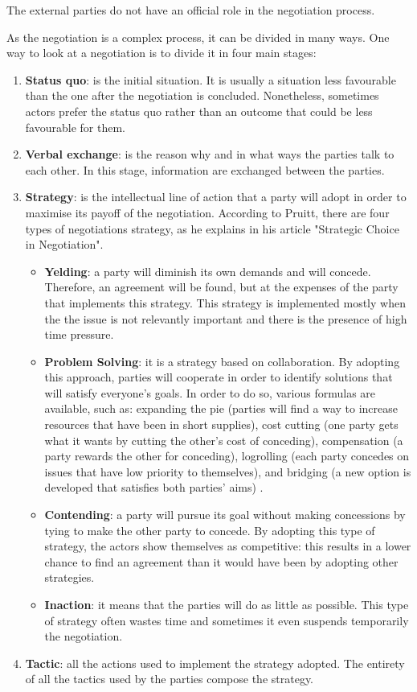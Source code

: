 \documentclass[../main.tex]{subfiles}
\begin{document}
The external parties do not have an official role in the negotiation process. %

As the negotiation is a complex process, it can be divided in many ways. One way to look at a negotiation is to divide it in four main stages:
\begin{enumerate}
\item \textbf{Status quo}: is the initial situation. It is usually a situation less favourable than the one after the negotiation is concluded. Nonetheless, sometimes actors prefer the status quo rather than an outcome that could be less favourable for them.
\item \textbf{Verbal exchange}: is the reason why and in what ways the parties talk to each other. In this stage, information are exchanged between the parties.
\item \textbf{Strategy}: is the intellectual line of action that a party will adopt in order to maximise its payoff of the negotiation. According to Pruitt, there are four types of negotiations strategy, as he explains in his article "Strategic Choice in Negotiation"\autocite[167]{pruitt}.
\begin{itemize}
\item \textbf{Yelding}: a party will diminish its own demands and will concede. Therefore, an agreement will be found, but at the expenses of the party that implements this strategy. This strategy is implemented mostly when the the issue is not relevantly important and there is the presence of high time pressure.
\item \textbf{Problem Solving}: it is a strategy based on collaboration. By adopting this approach, parties will cooperate in order to identify solutions that will satisfy everyone's goals. In order to do so, various formulas are available, such as: expanding the pie (parties will find a way to increase resources that have been in short supplies), cost cutting (one party gets what it wants by cutting the other's cost of conceding), compensation (a party rewards the other for conceding), logrolling (each party concedes on issues that have low priority to themselves), and bridging (a new option is developed that satisfies both parties' aims) \autocite[168]{pruitt}.
\item \textbf{Contending}: a party will pursue its goal without making concessions by tying to make the other party to concede. By adopting this type of strategy, the actors show themselves as competitive: this results in a lower chance to find an agreement than it would have been by adopting other strategies.
\item \textbf{Inaction}: it means that the parties will do as little as possible. This type of strategy often wastes time and sometimes it even suspends temporarily the negotiation\autocite[172]{pruitt}.
\end{itemize}
\item \textbf{Tactic}: all the actions used to implement the strategy adopted. The entirety of all the tactics used by the parties compose the strategy.
\end{enumerate}
\end{document}
